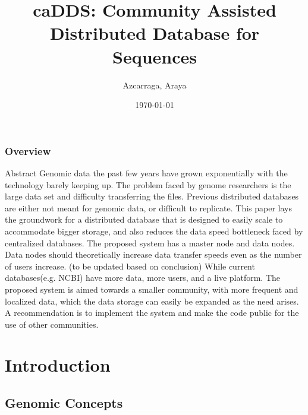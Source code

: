 \documentclass{beamer}
\title[caDDS]{caDDS: Community Assisted Distributed Database for Sequences}
\author{Azcarraga, Araya} %
\institute[Department of Computer Science, University of the Philippine - Diliman] %
{
University of the Philippine - Diliman\\ %
\medskip
}
\date{\today} %
\begin{document}
\begin{frame}
\titlepage %
\end{frame}


\begin{frame}
\frametitle{Overview} %
\tableofcontents %
\end{frame}

\begin{frame}{Abstract}
  Genomic data the past few years have grown exponentially with the technology barely keeping up. The problem faced by genome researchers is the large data set and difficulty transferring the files. Previous distributed databases are either not meant for genomic data, or difficult to replicate. This paper lays the groundwork for a distributed database that is designed to easily scale to accommodate bigger storage, and also reduces the data speed bottleneck faced by centralized databases. The proposed system has a master node and data nodes. Data nodes should theoretically increase data transfer speeds even as the number of users increase. (to be updated based on conclusion) While current databases(e.g. NCBI) have more data, more users, and a live platform. The proposed system is aimed towards a smaller community, with more frequent and localized data, which the data storage can easily be expanded as the need arises. A recommendation is to implement the system and make the code public for the use of other communities.
\end{frame}
\section{Introduction}
\subsection{Genomic Concepts}
\end{document}
